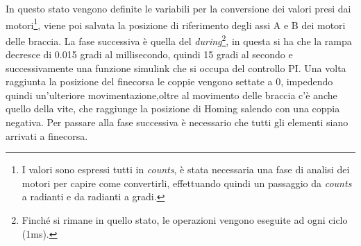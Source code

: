 \par In questo stato vengono definite le variabili per la conversione dei valori presi dai motori\footnote{I valori sono espressi tutti in \textit{counts},  è stata necessaria una fase di analisi dei motori per capire come convertirli, effettuando quindi un passaggio da \textit{counts} a radianti e da radianti a gradi.}, viene poi salvata la posizione di riferimento degli assi A e B dei motori delle braccia. La fase successiva è quella del \textit{during}\footnote{Finché si rimane in quello stato, le operazioni vengono eseguite ad ogni ciclo (1ms).}, in questa si ha che la rampa decresce di 0.015 gradi al millisecondo, quindi 15 gradi al secondo e successivamente una funzione simulink che si occupa del controllo PI. Una volta raggiunta la posizione del finecorsa le coppie vengono settate a 0, impedendo quindi un'ulteriore movimentazione,oltre al movimento delle braccia c'è anche quello della vite, che raggiunge la posizione di Homing salendo con una coppia negativa. Per passare alla fase successiva è necessario che tutti gli elementi siano arrivati a finecorsa.
